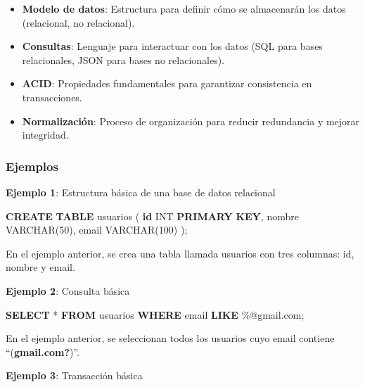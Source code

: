 \documentclass[
  a4paper,
  DIV=11,
  numbers=noendperiod,
  onepage,
  openany]{scrreprt}
\newenvironment{Shaded}{\begin{snugshade}}{\end{snugshade}}
\newcommand{\DataTypeTok}[1]{\textcolor[rgb]{0.68,0.00,0.00}{#1}}
\newcommand{\DecValTok}[1]{\textcolor[rgb]{0.68,0.00,0.00}{#1}}
\newcommand{\KeywordTok}[1]{\textcolor[rgb]{0.00,0.23,0.31}{\textbf{#1}}}
\newcommand{\NormalTok}[1]{\textcolor[rgb]{0.00,0.23,0.31}{#1}}
\newcommand{\OperatorTok}[1]{\textcolor[rgb]{0.37,0.37,0.37}{#1}}
\newcommand{\StringTok}[1]{\textcolor[rgb]{0.13,0.47,0.30}{#1}}
\providecommand{\tightlist}{%
  \setlength{\itemsep}{0pt}\setlength{\parskip}{0pt}}\usepackage{longtable,booktabs,array}
\begin{document}
\begin{itemize}
\tightlist
\item
  \textbf{Modelo de datos}: Estructura para definir cómo se almacenarán
  los datos (relacional, no relacional).
\item
  \textbf{Consultas}: Lenguaje para interactuar con los datos (SQL para
  bases relacionales, JSON para bases no relacionales).
\item
  \textbf{ACID}: Propiedades fundamentales para garantizar consistencia
  en transacciones.
\item
  \textbf{Normalización}: Proceso de organización para reducir
  redundancia y mejorar integridad.
\end{itemize}

\subsubsection{Ejemplos}\label{ejemplos-3}

\textbf{Ejemplo 1}: Estructura básica de una base de datos relacional

\begin{Shaded}
\begin{Highlighting}[]
\KeywordTok{CREATE} \KeywordTok{TABLE}\NormalTok{ usuarios (}
    \KeywordTok{id} \DataTypeTok{INT} \KeywordTok{PRIMARY} \KeywordTok{KEY}\NormalTok{,}
\NormalTok{    nombre }\DataTypeTok{VARCHAR}\NormalTok{(}\DecValTok{50}\NormalTok{),}
\NormalTok{    email }\DataTypeTok{VARCHAR}\NormalTok{(}\DecValTok{100}\NormalTok{)}
\NormalTok{); }
\end{Highlighting}
\end{Shaded}

En el ejemplo anterior, se crea una tabla llamada usuarios con tres
columnas: id, nombre y email.

\textbf{Ejemplo 2}: Consulta básica

\begin{Shaded}
\begin{Highlighting}[]
\KeywordTok{SELECT} \OperatorTok{*} \KeywordTok{FROM}\NormalTok{ usuarios }\KeywordTok{WHERE}\NormalTok{ email }\KeywordTok{LIKE} \StringTok{\textquotesingle{}\%@gmail.com\textquotesingle{}}\NormalTok{;}
\end{Highlighting}
\end{Shaded}

En el ejemplo anterior, se seleccionan todos los usuarios cuyo email
contiene ``(\textbf{gmail.com?})''.

\textbf{Ejemplo 3}: Transacción básica
\end{document}
